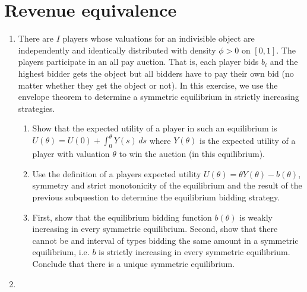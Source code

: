 \documentclass[a4paper,12pt]{article}
\begin{document}
\section{Revenue equivalence}
\label{sec:revenue-equivalence}

\begin{enumerate}
\item There are $I$ players whose valuations for an indivisible object are independently and identically distributed with density $\phi>0$ on $[0,1]$. The players participate in an all pay auction. That is, each player bids $b_i$ and the highest bidder gets the object but all bidders have to pay their own bid (no matter whether they get the object or not). In this exercise, we use the envelope theorem to determine a symmetric equilibrium in strictly increasing strategies.
  \begin{enumerate}
  \item Show that the expected utility of a player in such an equilibrium is $U(\theta)=U(0)+\int_0^\theta Y(s)\,ds$ where $Y(\theta)$ is the expected utility of a player with valuation $\theta$ to win the auction (in this equilibrium).
  \item Use the definition of a players expected utility $U(\theta)=\theta Y(\theta )-b(\theta )$, symmetry and strict monotonicity of the equilibrium and the result of the previous subquestion to determine the equilibrium bidding strategy.
    \item First, show that the equilibrium bidding function $b(\theta )$ is weakly increasing in every symmetric equilibrium. Second, show that there cannot be and interval of types bidding the same amount in a symmetric equilibrium, i.e. $b$ is strictly increasing in every symmetric equilibrium. Conclude that there is a unique symmetric equilibrium.
    \end{enumerate}
    \item 
\end{enumerate}



\end{document}
